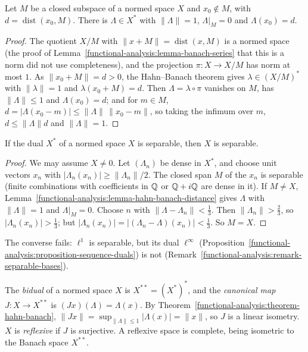 \begin{lemma}\label{functional-analysis:lemma-hahn-banach-distance}
Let $M$ be a closed subspace of a normed space $X$ and $x_0 \notin M$, with $d = \operatorname{dist}(x_0, M)$. There is $\Lambda \in X^*$ with $\|\Lambda\| = 1$, $\Lambda|_M = 0$ and $\Lambda(x_0) = d$.
\end{lemma}

\begin{proof}
The quotient $X/M$ with $\|x + M\| = \operatorname{dist}(x, M)$ is a normed space (the proof of Lemma~\ref{functional-analysis:lemma-banach-series} that this is a norm did not use completeness), and the
projection $\pi \colon X \to X/M$ has norm at most $1$. As $\|x_0 + M\| = d > 0$, the Hahn--Banach theorem gives $\lambda \in (X/M)^*$ with $\|\lambda\| = 1$ and $\lambda(x_0 + M) = d$. Then $\Lambda = \lambda \circ \pi$
vanishes on $M$, has $\|\Lambda\| \leq 1$ and $\Lambda(x_0) = d$; and for $m \in M$, $d = |\Lambda(x_0 - m)| \leq \|\Lambda\|\,\|x_0 - m\|$, so taking the infimum over $m$, $d \leq \|\Lambda\|d$ and $\|\Lambda\| = 1$.
\end{proof}

\begin{lemma}\label{functional-analysis:lemma-dual-separable}
If the dual $X^*$ of a normed space $X$ is separable, then $X$ is separable.
\end{lemma}

\begin{proof}
We may assume $X \neq 0$. Let $(\Lambda_n)$ be dense in $X^*$, and choose unit vectors $x_n$ with $|\Lambda_n(x_n)| \geq \|\Lambda_n\|/2$. The closed span $M$ of the $x_n$ is separable (finite combinations with
coefficients in $\mathbb{Q}$ or $\mathbb{Q} + i\mathbb{Q}$ are dense in it). If $M \neq X$, Lemma~\ref{functional-analysis:lemma-hahn-banach-distance} gives $\Lambda$ with $\|\Lambda\| = 1$ and $\Lambda|_M = 0$. Choose $n$ with
$\|\Lambda - \Lambda_n\| < \frac13$. Then $\|\Lambda_n\| > \frac23$, so $|\Lambda_n(x_n)| > \frac13$; but $|\Lambda_n(x_n)| = |(\Lambda_n - \Lambda)(x_n)| < \frac13$. So $M = X$.
\end{proof}

The converse fails: $\ell^1$ is separable, but its dual $\ell^\infty$ (Proposition~\ref{functional-analysis:proposition-sequence-duals}) is not (Remark~\ref{functional-analysis:remark-separable-bases}).

\begin{definition}\label{functional-analysis:definition-reflexive}
The \emph{bidual} of a normed space $X$ is $X^{**} = (X^*)^*$, and the \emph{canonical map} $J \colon X \to X^{**}$ is $(Jx)(\Lambda) = \Lambda(x)$. By Theorem~\ref{functional-analysis:theorem-hahn-banach},
$\|Jx\| = \sup_{\|\Lambda\| \leq 1}|\Lambda(x)| = \|x\|$, so $J$ is a linear isometry. $X$ is \emph{reflexive} if $J$ is surjective. A reflexive space is complete, being isometric to the Banach space $X^{**}$.
\end{definition}

